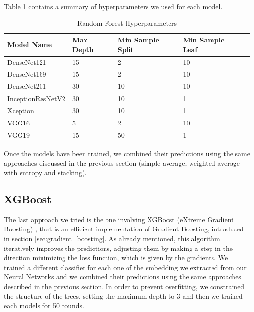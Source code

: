 \noindent Table \ref{table:table_4.3} contains a summary of hyperparameters we used for each model.

\begin{table}[h!]
\centering
\begin{tabular}{|l|l|l|l|l|} 
\hline
\textbf{Model Name} &   \hfil \textbf{Max Depth}&   \hfil \textbf{Min Sample Split}&   \hfil \textbf{Min Sample Leaf}\\
\hline
DenseNet121 &       \hfil15  &   \hfil2 &   \hfil10  \\\hline
DenseNet169 &       \hfil15  &   \hfil2 &   \hfil10  \\\hline
DenseNet201 &       \hfil30  &   \hfil10 &   \hfil10  \\\hline
InceptionResNetV2&  \hfil30  &   \hfil10 &   \hfil1  \\\hline
Xception    &       \hfil30  &   \hfil10 &   \hfil1  \\\hline
VGG16       &       \hfil 5  &   \hfil2 &   \hfil 10 \\\hline
VGG19       &       \hfil15  &   \hfil50 &   \hfil 1 \\
\hline
\end{tabular}
\caption{Random Forest Hyperparameters}
\label{table:table_4.3}
\end{table}


\noindent Once the models have been trained, we combined their predictions using the same approaches discussed in the previous section (simple average, weighted average with entropy and stacking).


\subsection{XGBoost}
\label{sec:xgboost_model}
The last approach we tried is the one involving XGBoost (eXtreme Gradient Boosting) \cite{xgboost}, that is an efficient implementation of Gradient Boosting, introduced in section \ref{sec:gradient_boosting}. As already mentioned, this algorithm iteratively improves the predictions, adjusting them by making a step in the direction minimizing the loss function, which is given by the gradients.
We trained a different classifier for each one of the embedding we extracted from our Neural Networks and we combined their predictions using the same approaches described in the previous section.
In order to prevent overfitting, we constrained the structure of the trees, setting the maximum depth to 3 and then we trained each models for 50 rounds. 



